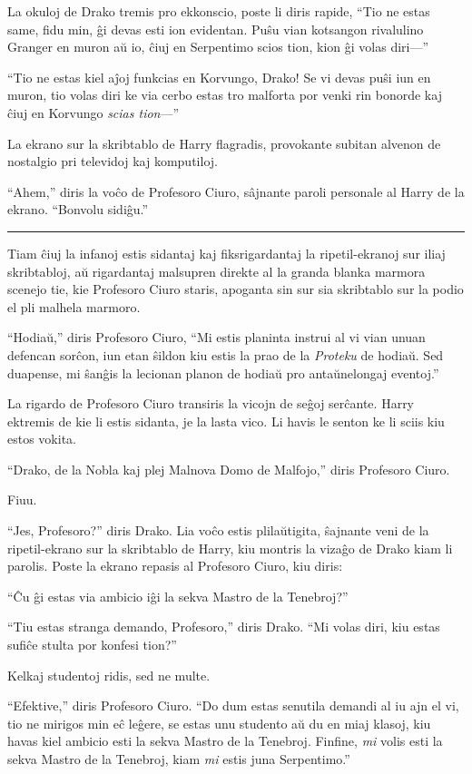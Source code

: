 La okuloj de Drako tremis pro ekkonscio, poste li diris rapide, ``Tio
ne estas same, fidu min, ĝi devas esti ion evidentan. Puŝu vian
kotsangon rivalulino Granger en muron aŭ io, ĉiuj en Serpentimo scios
tion, kion ĝi volas diri—''

``Tio ne estas kiel aĵoj funkcias en Korvungo, Drako! Se vi devas puŝi
iun en muron, tio volas diri ke via cerbo estas tro malforta por venki
rin bonorde kaj ĉiuj en Korvungo \emph{scias tion}—''

La ekrano sur la skribtablo de Harry flagradis, provokante subitan
alvenon de nostalgio pri televidoj kaj komputiloj.

``Ahem,'' diris la voĉo de Profesoro Ciuro, sâjnante paroli personale
al Harry de la ekrano. ``Bonvolu sidiĝu.''


\begin{center}\rule{3in}{0.4pt}\end{center}

Tiam ĉiuj la infanoj estis sidantaj kaj fiksrigardantaj la
ripetil-ekranoj sur iliaj skribtabloj, aŭ rigardantaj malsupren
direkte al la granda blanka marmora scenejo tie, kie Profesoro Ciuro
staris, apoganta sin sur sia skribtablo sur la podio el pli malhela
marmoro.

``Hodiaŭ,'' diris Profesoro Ciuro, ``Mi estis planinta instrui al vi
vian unuan defencan sorĉon, iun etan ŝildon kiu estis la prao de la
\emph{Proteku} de hodiaŭ. Sed duapense, mi ŝanĝis la lecionan planon
de hodiaŭ pro antaŭnelongaj eventoj.''

La rigardo de Profesoro Ciuro transiris la vicojn de seĝoj
serĉante. Harry ektremis de kie li estis sidanta, je la lasta vico. Li
havis le senton ke li sciis kiu estos vokita.

``Drako, de la Nobla kaj plej Malnova Domo de Malfojo,'' diris Profesoro Ciuro.

Fiuu.

``Jes, Profesoro?'' diris Drako. Lia voĉo estis plilaŭtigita, ŝajnante
veni de la ripetil-ekrano sur la skribtablo de Harry, kiu montris la
vizaĝo de Drako kiam li parolis. Poste la ekrano repasis al Profesoro
Ciuro, kiu diris:

``Ĉu ĝi estas via ambicio iĝi la sekva Mastro de la Tenebroj?''

``Tiu estas stranga demando, Profesoro,'' diris Drako. ``Mi volas
diri, kiu estas sufiĉe stulta por konfesi tion?''

Kelkaj studentoj ridis, sed ne multe.

``Efektive,'' diris Profesoro Ciuro. ``Do dum estas senutila demandi
al iu ajn el vi, tio ne mirigos min eĉ leĝere, se estas unu studento
aŭ du en miaj klasoj, kiu havas kiel ambicio esti la sekva Mastro de
la Tenebroj. Finfine, \emph{mi} volis esti la sekva Mastro de la
Tenebroj, kiam \emph{mi} estis juna Serpentimo.''

